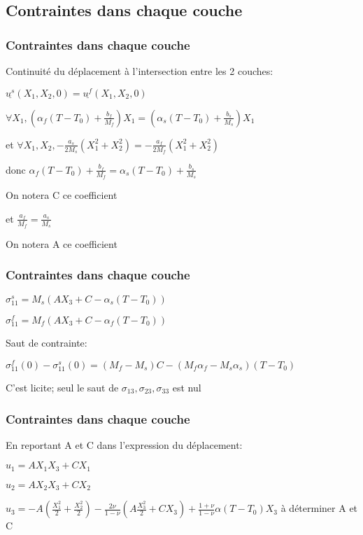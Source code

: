 \subsection{Contraintes dans chaque couche} 
\begin{frame}
    \frametitle{Contraintes dans chaque couche}
        \item Continuité du déplacement à l'intersection entre les 2 couches:
        \item $\underline{u^s}(X_1,X_2,0)=\underline{u^f}(X_1,X_2,0)$
        \item $\forall X_1,(\alpha_f(T-T_0)+\frac{b_f}{M_f})X_1 = (\alpha_s(T-T_0)+\frac{b_s}{M_s})X_1$
        \item et $\forall X_1,X_2, -\frac{a_s}{2M_s}(X_1^2+X_2^2)=-\frac{a_f}{2M_f}(X_1^2+X_2^2)$
        \item donc $\alpha_f(T-T_0)+\frac{b_f}{M_f}=\alpha_s(T-T_0)+\frac{b_s}{M_s}$
        \item On notera C ce coefficient
        \item et $\frac{a_f}{M_f}=\frac{a_s}{M_s}$
        \item On notera A ce coefficient

\end{frame} 
\begin{frame}
    \frametitle{Contraintes dans chaque couche}
        \item $\sigma_{11}^s=M_s(AX_3+C-\alpha_s(T-T_0))$
        \item $\sigma_{11}^f=M_f(AX_3+C-\alpha_f(T-T_0))$
        \item Saut de contrainte:
        \item $\sigma_{11}^f(0)-\sigma_{11}^s(0) = (M_f-M_s)C-(M_f\alpha_f-M_s\alpha_s)(T-T_0)$
        \item C'est licite; seul le saut de $\sigma_{13},\sigma_{23},\sigma_{33}$ est nul

\end{frame} 

\begin{frame}
    \frametitle{Contraintes dans chaque couche}
        \item En reportant A et C dans l'expression du déplacement:
        \item $u_1=AX_1X_3+CX_1$
        \item $u_2=AX_2X_3+CX_2$
        \item $u_3= -A(\frac{X_1^2}{2}+\frac{X_2^2}{2})-\frac{2\nu}{1-\nu}(A\frac{X_3^2}{2}+CX_3)+\frac{1+\nu}{1-\nu}\alpha(T-T_0)X_3$
        \Reste à déterminer A et C

\end{frame} 
